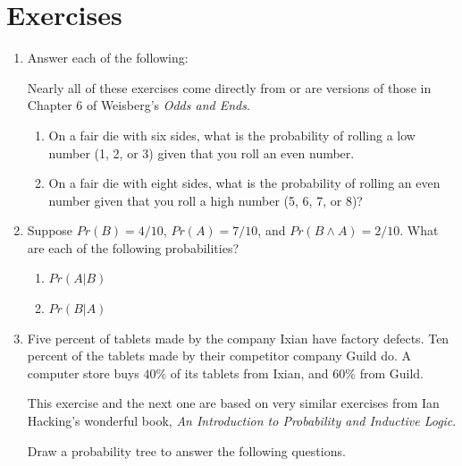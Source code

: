 \documentclass[]{tufte-book}
\providecommand{\tightlist}{%
  \setlength{\itemsep}{0pt}\setlength{\parskip}{0pt}}
\begin{document}
\hypertarget{exercises-9}{%
\section{Exercises}\label{exercises-9}}

\begin{enumerate}
\def\labelenumi{\arabic{enumi}.}
\item
  Answer each of the following:

  \begin{marginfigure}
   Nearly all of these exercises come directly from or are versions of
   those in Chapter 6 of Weisberg's \emph{Odds and Ends}.
   \end{marginfigure}

  \begin{enumerate}
  \def\labelenumii{\alph{enumii}.}
  \tightlist
  \item
    On a fair die with six sides, what is the probability of rolling a low number (1, 2, or 3) given that you roll an even number.
  \item
    On a fair die with eight sides, what is the probability of rolling an even number given that you roll a high number (5, 6, 7, or 8)?
  \end{enumerate}
\item
  Suppose \(Pr(B) = 4/10\), \(Pr(A) = 7/10\), and \(Pr(B \wedge A) = 2/10\).
  What are each of the following probabilities?

  \begin{enumerate}
  \def\labelenumii{\alph{enumii}.}
  \tightlist
  \item
    \(Pr(A | B)\)
  \item
    \(Pr(B | A)\)
  \end{enumerate}
\item
  Five percent of tablets made by the company Ixian have factory defects. Ten percent of the tablets made by their competitor company Guild do. A computer store buys \(40\%\) of its tablets from Ixian, and \(60\%\) from Guild.

  \begin{marginfigure}
   This exercise and the next one are based on very similar exercises from
   Ian Hacking's wonderful book, \emph{An Introduction to Probability and
   Inductive Logic}.
   \end{marginfigure}

  Draw a probability tree to answer the following questions.


\end{enumerate}
\end{document}
